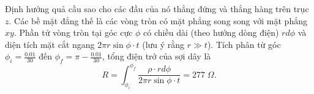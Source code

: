 



\begin{solution}

Định hướng quả cầu sao cho các đầu của nó thẳng đứng và thẳng hàng trên trục $z$. Các bề mặt đẳng thế là các vòng tròn có mặt phẳng song song với mặt phẳng $xy$. Phần tử vòng tròn tại góc cực $\phi$ có chiều dài (theo hướng dòng điện) $rd\phi$ và diện tích mặt cắt ngang $2\pi r\sin\phi\cdot t$ (lưu ý rằng $r\gg t$). Tích phân từ góc $\phi_i=\frac{0.01}{30}$ đến $\phi_f=\pi-\frac{0.01}{30}$, tổng điện trở của sợi dây là $$R=\int_{\phi_i}^{\phi_f}\frac{\rho\cdot rd\phi}{2\pi r\sin\phi\cdot t}=\boxed{277\;\Omega}.$$


\end{solution}
